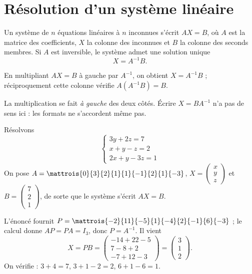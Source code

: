 \section{Résolution d'un système linéaire}

\begin{propriete}
Un système de $n$ équations linéaires à $n$ inconnues s'écrit $AX = B$, où
$A$ est la matrice des coefficients, $X$ la colonne des inconnues et $B$ la
colonne des seconds membres. Si $A$ est inversible, le système admet une
solution unique
\[
  X = A^{-1}B .
\]
\end{propriete}

\begin{demonstration}
En multipliant $AX = B$ à gauche par $A^{-1}$, on obtient $X = A^{-1}B$ ;
réciproquement cette colonne vérifie $A\left(A^{-1}B\right) = B$.
\end{demonstration}

\begin{avertissement}
La multiplication se fait \emph{à gauche} des deux côtés. Écrire
$X = BA^{-1}$ n'a pas de sens ici : les formats ne s'accordent même pas.
\end{avertissement}

\begin{exemple}
Résolvons
\[
  \begin{cases}
    3y+2z = 7 \\ x+y-z = 2 \\ 2x+y-3z = 1
  \end{cases}
\]
On pose $A = \mattrois{0}{3}{2}{1}{1}{-1}{2}{1}{-3}$,
$X = \begin{pmatrix} x \\ y \\ z \end{pmatrix}$ et
$B = \begin{pmatrix} 7 \\ 2 \\ 1 \end{pmatrix}$, de sorte que le système
s'écrit $AX = B$.

L'énoncé fournit $P = \mattrois{-2}{11}{-5}{1}{-4}{2}{-1}{6}{-3}$ ; le calcul
donne $AP = PA = I_{3}$, donc $P = A^{-1}$. Il vient
\[
  X = PB = \begin{pmatrix} -14+22-5 \\ 7-8+2 \\ -7+12-3 \end{pmatrix}
    = \begin{pmatrix} 3 \\ 1 \\ 2 \end{pmatrix}.
\]
On vérifie : $3+4 = 7$, $3+1-2 = 2$, $6+1-6 = 1$.
\end{exemple}

